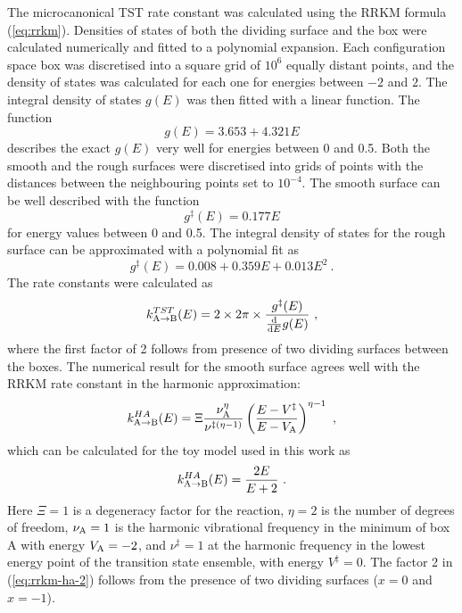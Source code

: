 The microcanonical TST rate constant was calculated using the RRKM formula (\ref{eq:rrkm}).
Densities of states of both the dividing surface and the box were calculated numerically and fitted to a polynomial expansion.
Each configuration space box was discretised into a square grid of $10^6$ equally distant points, and the density of states was calculated for each one for energies between $-2$ and $2$.
The integral density of states $g(E)$ was then fitted with a linear function.
The function
\begin{equation}
\label{eq:rrkm-fit-gE}
g(E) = 3.653 + 4.321 E
\end{equation}
describes the exact $g(E)$ very well for energies between 0 and 0.5.
Both the smooth and the rough surfaces were discretised into grids of points with the distances between the neighbouring points set to $10^{-4}$.
The smooth surface can be well described with the function
\begin{equation}
\label{eq:rrkm-smooth-gE}
g^{\ddagger}(E) = 0.177 E
\end{equation}
for energy values between 0 and 0.5.
The integral density of states for the rough surface can be approximated with a polynomial fit as
\begin{equation}
\label{eq:rrkm-rough-gE}
g^{\ddagger}(E) = 0.008 + 0.359 E + 0.013 E^2 ~.
\end{equation}
The rate constants were calculated as
\begin{equation}
\label{eq:rrkm-rrkm-num}
k^{TST}_{\rm A \rightarrow B} (E) = 2 \times 2 \pi \times \frac{g^{\ddagger}(E)}{\frac{\rm d}{{\rm d} E} g(E)} ~,
\end{equation}
where the first factor of 2 follows from presence of two dividing surfaces between the boxes.
The numerical result for the smooth surface agrees well with the RRKM rate constant in the harmonic approximation:
\begin{equation}
\label{eq:rrkm-ha}
k^{HA}_{\rm A \rightarrow B} (E) = \Xi \frac{\nu_{\rm A}^\eta}{\nu^{\ddagger (\eta-1)}} \left( \frac{E - V^{\ddagger}}{E - V_{\rm A}} \right)^{\eta - 1} ~,
\end{equation}
which can be calculated for the toy model used in this work as
\begin{equation}
\label{eq:rrkm-ha-2}
k^{HA}_{\rm A \rightarrow B} (E) =  \frac{2 E}{E + 2} ~.
\end{equation}
Here $\Xi = 1$ is a degeneracy factor for the reaction, $\eta = 2$ is the number of degrees of freedom, $\nu_{\rm A} = 1$ is the harmonic vibrational frequency in the minimum of box A with energy $V_{\rm A} = -2$, and $\nu^{\ddagger} = 1$ at the harmonic frequency in the lowest energy point of the transition state ensemble, with energy $V^{\ddagger} = 0$. The factor 2 in (\ref{eq:rrkm-ha-2}) follows from the presence of two dividing surfaces ($x = 0$ and $x = -1$).


